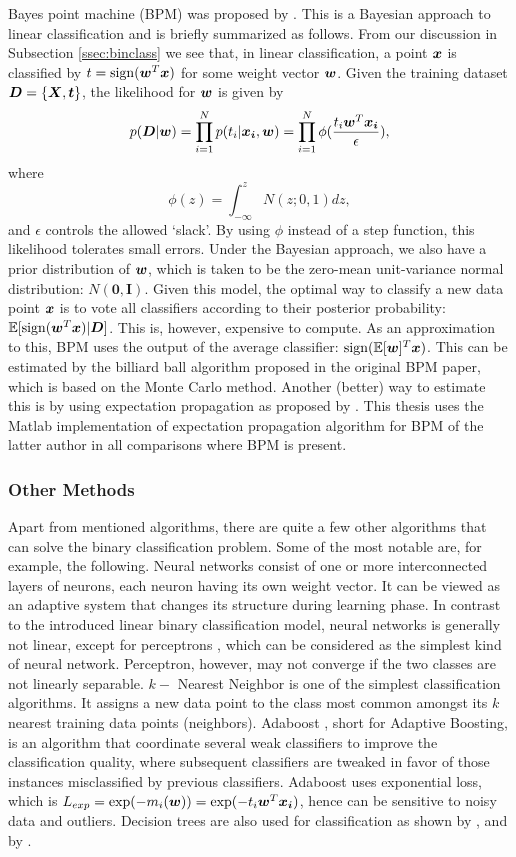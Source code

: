 Bayes point machine (BPM) was proposed by \cite{Herbrich}. This is a Bayesian approach to linear classification and is briefly summarized as follows. From our discussion in Subsection \ref{ssec:binclass} we see that, in linear classification, a point $\boldsymbol{x}$ is classified by $t = \operatorname{sign}(\boldsymbol{w}^T \boldsymbol{x})$ for some weight vector $\boldsymbol{w}$. Given the training dataset $\boldsymbol{D} = \{\boldsymbol{X}, \boldsymbol{t} \}$, the likelihood for $\boldsymbol{w}$ is given by
$$p(\boldsymbol{D} | \boldsymbol{w}) = \prod_{i=1}^N p(t_i | \boldsymbol{x_i}, \boldsymbol{w}) = \prod_{i=1}^N \phi(\frac{t_i\boldsymbol{w}^T\boldsymbol{x_i}}{\epsilon}),$$
where 
$$\phi(z) = \int_{-\infty}^z N(z; 0, 1) dz,$$
and $\epsilon$ controls the allowed `slack'. By using $\phi$ instead of a step function, this likelihood tolerates small errors. Under the Bayesian approach, we also have a prior distribution of $\boldsymbol{w}$, which is taken to be the zero-mean unit-variance normal distribution: $N(\boldsymbol{0, I})$. Given this model, the optimal way to classify a new data point $\boldsymbol{x}$ is to vote all classifiers according to their posterior probability: $\mathbb{E}[\operatorname{sign}(\boldsymbol{w}^T \boldsymbol{x}) | \boldsymbol{D}]$. This is, however, expensive to compute. As an approximation to this, BPM uses the output of the average classifier: $\operatorname{sign}(\mathbb{E}[\boldsymbol{w}] ^T \boldsymbol{x})$. This can be estimated by the billiard ball algorithm proposed in the original BPM paper, which is based on the Monte Carlo method. Another (better) way to estimate this is by using expectation propagation as proposed by \cite{bpm}. This thesis uses the Matlab implementation of expectation propagation algorithm for BPM of the latter author in all comparisons where BPM is present. 

\subsubsection{Other Methods}

Apart from mentioned algorithms, there are quite a few other algorithms that can solve the binary classification problem. Some of the most notable are, for example, the following. Neural networks \cite{bishop2} consist of one or more interconnected layers of neurons, each neuron having its own weight vector. It can be viewed as an adaptive system that changes its structure during learning phase. In contrast to the introduced linear binary classification model, neural networks is generally not linear, except for perceptrons \cite{perceptron}, which can be considered as the simplest kind of neural network. Perceptron, however, may not converge if the two classes are not linearly separable. $k-$ Nearest Neighbor \cite{kNN} is one of the simplest classification algorithms. It assigns a new data point to the class most common amongst its $k$ nearest training data points (neighbors). Adaboost \cite{adaboost}, short for Adaptive Boosting, is an algorithm that coordinate several weak classifiers to improve the classification quality, where subsequent classifiers are tweaked in favor of those instances misclassified by previous classifiers. Adaboost uses exponential loss, which is $L_{exp} = \exp(-m_i(\boldsymbol{w})) = \exp(-t_i\boldsymbol{w}^T\boldsymbol{x_i})$, hence can be sensitive to noisy data and outliers. Decision trees are also used for classification as shown by \cite{tree1}, and by \cite{tree2}. 

